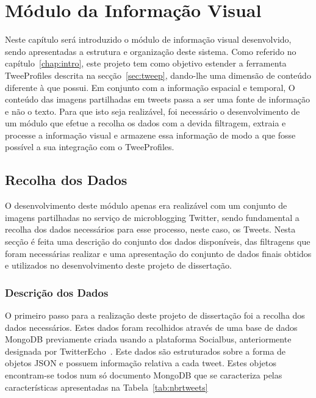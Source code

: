 \chapter{Módulo da Informação Visual} \label{chap:chap3}

Neste capítulo será introduzido o módulo de informação visual desenvolvido, sendo apresentadas a estrutura e organização deste sistema. Como referido no capítulo~\ref{chap:intro}, este projeto tem como objetivo estender a ferramenta TweeProfiles descrita na secção~\ref{sec:tweep}, dando-lhe uma dimensão de conteúdo diferente à que possui. Em conjunto com a informação espacial e temporal, O conteúdo das imagens partilhadas em tweets passa a ser uma fonte de informação e não o texto. Para que isto seja realizável, foi necessário o desenvolvimento de um módulo que efetue a recolha os dados com a devida filtragem, extraia e processe a informação visual e armazene essa informação de modo a que fosse possível a sua integração com o TweeProfiles. 

\section{Recolha dos Dados}\label{sec:dados}

O desenvolvimento deste módulo apenas era realizável com um conjunto de imagens partilhadas no serviço de microblogging Twitter, sendo fundamental a recolha dos dados necessários para esse processo, neste caso, os Tweets. Nesta secção é feita uma descrição do conjunto dos dados disponíveis, das filtragens que foram necessárias realizar e uma apresentação do conjunto de dados finais obtidos e utilizados no desenvolvimento deste projeto de dissertação.

\subsection{Descrição dos Dados}

O primeiro passo para a realização deste projeto de dissertação foi a recolha dos dados necessários. Estes dados foram recolhidos através de uma base de dados MongoDB previamente criada usando a plataforma Socialbus, anteriormente designada por TwitterEcho~\cite{Boanjak2012}. Este dados são estruturados sobre a forma de objetos JSON e possuem informação relativa a cada tweet. Estes objetos encontram-se todos num só documento MongoDB que se caracteriza pelas características apresentadas na Tabela~\ref{tab:nbrtweets}

